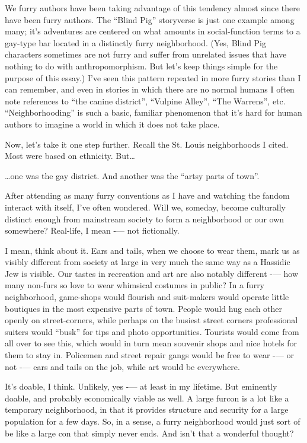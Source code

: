 We furry authors have been taking advantage of this tendency almost since there have been furry authors. The ``Blind Pig'' storyverse is just one example among many; it's adventures are centered on what amounts in social-function terms to a gay-type bar located in a distinctly furry neighborhood. (Yes, Blind Pig characters sometimes are not furry and suffer from unrelated issues that have nothing to do with anthropomorphism. But let's keep things simple for the purpose of this essay.) I've seen this pattern repeated in more furry stories than I can remember, and even in stories in which there are no normal humans I often note references to ``the canine district'', ``Vulpine Alley'', ``The Warrens'', etc. ``Neighborhooding'' is such a basic, familiar phenomenon that it's hard for human authors to imagine a world in which it does not take place.

Now, let's take it one step further. Recall the St. Louis neighborhoods I cited. Most were based on ethnicity. But\ldots

\ldots one was the gay district. And another was the ``artsy parts of town''.

After attending as many furry conventions as I have and watching the fandom interact with itself, I've often wondered. Will we, someday, become culturally distinct enough from mainstream society to form a neighborhood or our own somewhere? Real-life, I mean -— not fictionally.

I mean, think about it. Ears and tails, when we choose to wear them, mark us as visibly different from society at large in very much the same way as a Hassidic Jew is visible. Our tastes in recreation and art are also notably different -— how many non-furs so love to wear whimsical costumes in public? In a furry neighborhood, game-shops would flourish and suit-makers would operate little boutiques in the most expensive parts of town. People would hug each other openly on street-corners, while perhaps on the busiest street corners professional suiters would ``busk'' for tips and photo opportunities. Tourists would come from all over to see this, which would in turn mean souvenir shops and nice hotels for them to stay in. Policemen and street repair gangs would be free to wear -— or not -— ears and tails on the job, while art would be everywhere.

It's doable, I think. Unlikely, yes -— at least in my lifetime. But eminently doable, and probably economically viable as well. A large furcon is a lot like a temporary neighborhood, in that it provides structure and security for a large population for a few days. So, in a sense, a furry neighborhood would just sort of be like a large con that simply never ends. And isn't that a wonderful thought?

